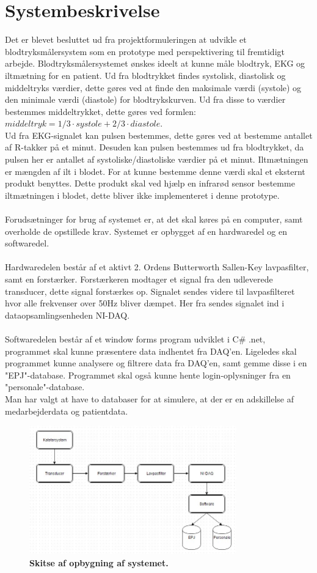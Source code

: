 \section{Systembeskrivelse}
Det er blevet besluttet ud fra projektformuleringen at udvikle et blodtryksmålersystem som en prototype med perspektivering til fremtidigt arbejde. Blodtryksmålersystemet ønskes ideelt at kunne måle blodtryk, EKG og iltmætning for en patient. Ud fra blodtrykket findes systolisk, diastolisk og middeltryks værdier, dette gøres ved at finde den maksimale værdi (systole) og den minimale værdi (diastole) for blodtrykskurven. Ud fra disse to værdier bestemmes middeltrykket, dette gøres ved formlen: $middeltryk = 1/3 \cdot systole + 2/3 \cdot diastole$. \cite{blodtrykwiki}
\\ Ud fra EKG-signalet kan pulsen bestemmes, dette gøres ved at bestemme antallet af R-takker på et minut. Desuden kan pulsen bestemmes ud fra blodtrykket, da pulsen her er antallet af systoliske/diastoliske værdier på et minut. Iltmætningen er mængden af ilt i blodet. For at kunne bestemme denne værdi skal et eksternt produkt benyttes. Dette produkt skal ved hjælp en infrarød sensor bestemme iltmætningen i blodet, dette bliver ikke implementeret i denne prototype.\\\\
Forudsætninger for brug af systemet er, at det skal køres på en computer, samt overholde de opstillede krav. Systemet er opbygget af en hardwaredel og en softwaredel. \\\\
Hardwaredelen består af et aktivt 2. Ordens Butterworth Sallen-Key lavpasfilter, samt en forstærker. Forstærkeren modtager et signal fra den udleverede transducer, dette signal forstærkes op. Signalet sendes videre til lavpasfilteret hvor alle frekvenser over 50Hz bliver dæmpet. Her fra sendes signalet ind i dataopsamlingsenheden NI-DAQ.\\\\
Softwaredelen består af et window forms program udviklet i C\# .net, programmet skal kunne præsentere data indhentet fra DAQ’en. Ligeledes skal programmet kunne analysere og filtrere data fra DAQ’en, samt gemme disse i en "EPJ"-database. Programmet skal også kunne hente login-oplysninger fra en "personale"-database. \\
Man har valgt at have to databaser for at simulere, at der er en adskillelse af medarbejderdata og patientdata.
\begin{figure}[H]
\includegraphics[width =0.8\textwidth , center]{billeder/system}
\caption{\textbf{Skitse af opbygning af systemet.}}
\end{figure}
\newpage
